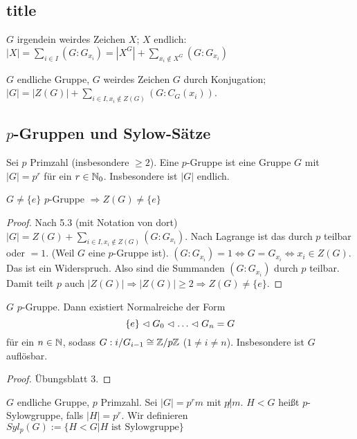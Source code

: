 \documentclass[12pt,a4paper]{scrartcl}
\begin{document}
\subsection{title}

\begin{satz}[Satz 5.2]
	$G$ irgendein weirdes Zeichen $X$; $X$ endlich: $|X| = \sum_{i\in I}(G: G_{x_i}) = |X^G| + \sum_{x_i\notin X^G}(G:G_{x_i})$
\end{satz}

\begin{satz}[Satz 5.3]
	$G$ endliche Gruppe, $G$ weirdes Zeichen $G$ durch Konjugation; $|G| = |Z(G)|+\sum_{i\in I, x_i\notin Z(G)}(G:C_G(x_i))$.
\end{satz}
\subsection{$p$-Gruppen und Sylow-Sätze}
\begin{defi}
	Sei $p$ Primzahl (insbesondere $\geq 2$). Eine $p$-Gruppe ist eine Gruppe $G$ mit $|G| = p^r$ für ein $r\in\mathbb N_0$. Insbesondere ist $|G|$ endlich.
\end{defi}
\begin{satz}
	$G\neq\{e\}$ $p$-Gruppe $\Rightarrow Z(G)\neq\{e\}$
\end{satz}
\begin{proof}
	Nach 5.3 (mit Notation von dort) $|G| = Z(G)+\sum_{i\in I, x_i\notin Z(G)}(G:G_{x_i})$. Nach Lagrange ist das durch $p$ teilbar oder $=1$. (Weil $G$ eine $p$-Gruppe ist). $(G:G_{x_i}) = 1 \Leftrightarrow G = G_{x_i}\Leftrightarrow x_i\in Z(G)$. Das ist ein Widerspruch. Also sind die Summanden $(G:G_{x_i})$ durch $p$ teilbar. Damit teilt $p$ auch $|Z(G)|\Rightarrow |Z(G)|\geq 2\Rightarrow Z(G)\neq \{e\}$.
\end{proof}

\begin{satz}
	$G$ $p$-Gruppe. Dann existiert Normalreiche der Form
	$$ \{e\}\nt G_0\nt\dots\nt G_n = G$$ für ein $n\in\mathbb N$, sodass $G:i/G_{i-1}\cong \mathbb Z/p\mathbb Z$ ($1\neq i\neq n$).
	Insbesondere ist $G$ auflösbar.
\end{satz}
\begin{proof}
	Übungsblatt 3.
\end{proof}

\begin{defi}
	$G$ endliche Gruppe, $p$ Primzahl. Sei $|G| = p^rm$ mit $p\not| m$. $H<G$ heißt $p$-Sylowgruppe, falls $|H| = p^r$. Wir definieren  $Syl_p(G):=\{H<G|H\text{ ist Sylowgruppe}\}$
\end{defi}
\end{document}
